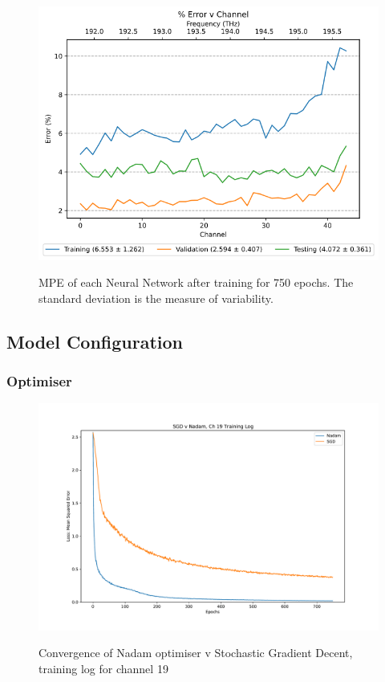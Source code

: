 
\begin{figure}
    \centering
    \caption{MPE of each Neural Network after training for 750 epochs. The standard deviation is the measure of variability.}
    \includegraphics[width=\textwidth]{project/img/ml_model/discrete/percent_error.png}
    \label{fig:ml_model:disc_train_val}
\end{figure}

\FloatBarrier
\subsection{Model Configuration}

\FloatBarrier
\subsubsection{Optimiser} \label{subsec:optimiser}

\begin{figure}[h]
    \centering
    \caption{Convergence of Nadam optimiser v Stochastic Gradient Decent, training log for channel 19}
    \includegraphics[width=\textwidth]{project/img/ml_model/discrete/SGD v Nadam, Ch 19 Training Log.pdf}
    \label{fig:ml_model:sgd_nadam}
\end{figure}


